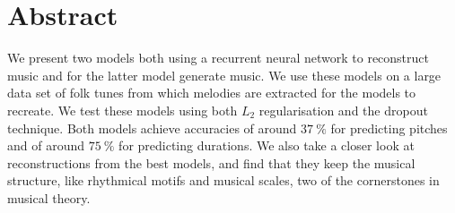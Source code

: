 \section*{Abstract}
\label{sec:abstract}

We present two models both using a recurrent neural network to reconstruct music and for the latter model generate music.
We use these models on a large data set of folk tunes from which melodies are extracted for the models to recreate.
We test these models using both $L_2$ regularisation and the dropout technique.
Both models achieve accuracies of around $\SI{37}{\%}$ for predicting pitches and of around $\SI{75}{\%}$ for predicting durations.
We also take a closer look at reconstructions from the best models, and find that they keep the musical structure, like rhythmical motifs and musical scales, two of the cornerstones in musical theory.

